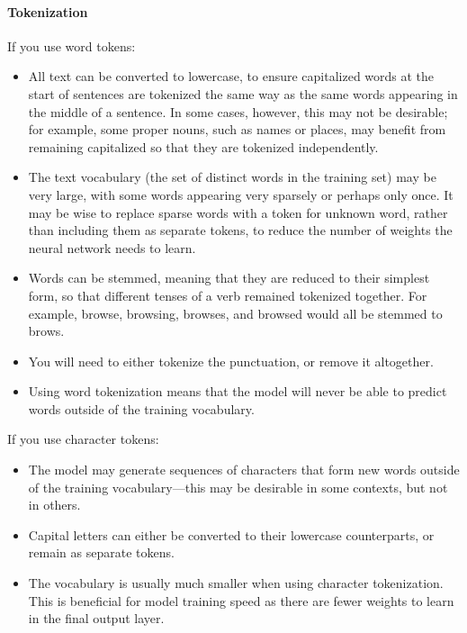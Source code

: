 \paragraph{Tokenization}

If you use word tokens:

\begin{itemize}
	\item  All text can be converted to lowercase, to ensure capitalized words at the start of sentences are tokenized the same way as the same words appearing in the middle of a sentence.
	      In some cases, however, this may not be desirable; for example, some proper nouns, such as names or places, may benefit from remaining capitalized so that they are tokenized independently.

	\item  The text vocabulary (the set of distinct words in the training set) may be very large, with some words appearing very sparsely or perhaps only once.
	      It may be wise to replace sparse words with a token for unknown word, rather than including them as separate tokens, to reduce the number of weights the neural network needs to learn.

	\item  Words can be stemmed, meaning that they are reduced to their simplest form, so that different tenses of a verb remained tokenized together.
	      For example, browse, browsing, browses, and browsed would all be stemmed to brows.

	\item  You will need to either tokenize the punctuation, or remove it altogether.
	\item  Using word tokenization means that the model will never be able to predict words outside of the training vocabulary.
\end{itemize}


If you use character tokens:

\begin{itemize}
	\item The model may generate sequences of characters that form new words outside of the training vocabulary—this may be desirable in some contexts, but not in others.

	\item Capital letters can either be converted to their lowercase counterparts, or remain as separate tokens.

	\item The vocabulary is usually much smaller when using character tokenization. This is beneficial for model training speed as there are fewer weights to learn in the final output layer.
\end{itemize}


